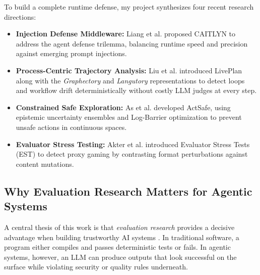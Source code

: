 \documentclass[conference]{IEEEtran}
\begin{document}
To build a complete runtime defense, my project synthesizes four recent research directions:
\begin{itemize}
    \item \textbf{Injection Defense Middleware:} Liang et al. \cite{liang2026caitlyn} proposed CAITLYN to address the agent defense trilemma, balancing runtime speed and precision against emerging prompt injections.
    \item \textbf{Process-Centric Trajectory Analysis:} Liu et al. \cite{liu2025liveplan} introduced LivePlan along with the \textit{Graphectory} and \textit{Langutory} representations to detect loops and workflow drift deterministically without costly LLM judges at every step.
    \item \textbf{Constrained Safe Exploration:} As et al. \cite{as2025actsafe} developed ActSafe, using epistemic uncertainty ensembles \cite{lakshminarayanan2017ensembles} and Log-Barrier optimization to prevent unsafe actions in continuous spaces.
    \item \textbf{Evaluator Stress Testing:} Akter et al. \cite{akter2026est} introduced Evaluator Stress Tests (EST) to detect proxy gaming \cite{skalse2022reward} by contrasting format perturbations against content mutations.
\end{itemize}

\subsection{Why Evaluation Research Matters for Agentic Systems}
A central thesis of this work is that \textit{evaluation research} provides a decisive advantage when building trustworthy AI systems \cite{debenedetti2024agentdojo, ruan2024toolemu}. In traditional software, a program either compiles and passes deterministic tests or fails. In agentic systems, however, an LLM can produce outputs that look successful on the surface while violating security or quality rules underneath.
\end{document}
